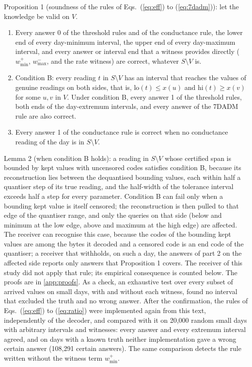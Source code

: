 Proposition 1 (soundness of the rules of Eqs.~(\ref{eq:eff}) to (\ref{eq:7dadm})): let the knowledge be valid on $V$.
\begin{enumerate}
  \item Every answer 0 of the threshold rules and of the conductance rule, the lower end of every day-minimum interval, the upper end of every day-maximum interval, and every answer or interval end that a witness provides directly ($w^{+}_{\min}$, $w^{-}_{\max}$, and the rate witness) are correct, whatever $S \setminus V$ is.
  \item Condition B: every reading $t$ in $S \setminus V$ has an interval that reaches the values of genuine readings on both sides, that is, $\mathrm{lo}(t) \le x(u)$ and $\mathrm{hi}(t) \ge x(v)$ for some $u, v$ in $V$. Under condition B, every answer 1 of the threshold rules, both ends of the day-extremum intervals, and every answer of the 7DADM rule are also correct.
  \item Every answer 1 of the conductance rule is correct when no conductance reading of the day is in $S \setminus V$.
\end{enumerate}
Lemma 2 (when condition B holds): a reading in $S \setminus V$ whose certified span is bounded by kept values with uncensored codes satisfies condition B, because its reconstruction lies between the dequantised bounding values, each within half a quantiser step of its true reading, and the half-width of the tolerance interval exceeds half a step for every parameter. Condition B can fail only when a bounding kept value is itself censored; the reconstruction is then pulled to that edge of the quantiser range, and only the queries on that side (below and minimum at the low edge, above and maximum at the high edge) are affected. The receiver can recognise this case, because the codes of the bounding kept values are among the bytes it decoded and a censored code is an end code of the quantiser; a receiver that withholds, on such a day, the answers of part 2 on the affected side reports only answers that Proposition 1 covers. The receiver of this study did not apply that rule; its empirical consequence is counted below. The proofs are in \ref{app:proofs}. As a check, an exhaustive test over every subset of arrived values on small days, with and without each witness, found no interval that excluded the truth and no wrong answer. After the confirmation, the rules of Eqs.~(\ref{eq:eff}) to (\ref{eq:ratio}) were implemented again from this text, independently of the decoder, and compared with it on 20,000 random small days with arbitrary intervals and witnesses: every answer and every extremum interval agreed, and on days with a known truth neither implementation gave a wrong certain answer (108,291 certain answers). The same comparison detects the rule written without the witness term $w^{+}_{\min}$.

